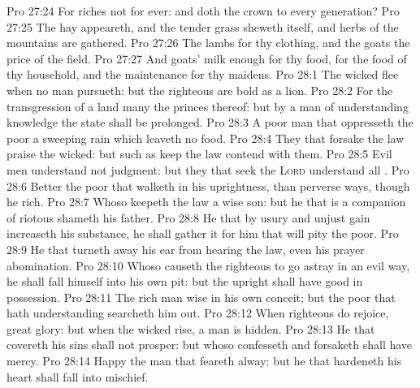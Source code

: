 \vs Pro 27:24 For riches  not for ever: and doth the crown  to every generation?
\vs Pro 27:25 The hay appeareth, and the tender grass sheweth itself, and herbs of the mountains are gathered.
\vs Pro 27:26 The lambs  for thy clothing, and the goats  the price of the field.
\vs Pro 27:27 And  goats' milk enough for thy food, for the food of thy household, and  the maintenance for thy maidens.
\vs Pro 28:1 The wicked flee when no man pursueth: but the righteous are bold as a lion.
\vs Pro 28:2 For the transgression of a land many  the princes thereof: but by a man of understanding  knowledge the state  shall be prolonged.
\vs Pro 28:3 A poor man that oppresseth the poor  a sweeping rain which leaveth no food.
\vs Pro 28:4 They that forsake the law praise the wicked: but such as keep the law contend with them.
\vs Pro 28:5 Evil men understand not judgment: but they that seek the \textsc{Lord} understand all .
\vs Pro 28:6 Better  the poor that walketh in his uprightness, than  perverse  ways, though he  rich.
\vs Pro 28:7 Whoso keepeth the law  a wise son: but he that is a companion of riotous  shameth his father.
\vs Pro 28:8 He that by usury and unjust gain increaseth his substance, he shall gather it for him that will pity the poor.
\vs Pro 28:9 He that turneth away his ear from hearing the law, even his prayer  abomination.
\vs Pro 28:10 Whoso causeth the righteous to go astray in an evil way, he shall fall himself into his own pit: but the upright shall have good  in possession.
\vs Pro 28:11 The rich man  wise in his own conceit; but the poor that hath understanding searcheth him out.
\vs Pro 28:12 When righteous  do rejoice,  great glory: but when the wicked rise, a man is hidden.
\vs Pro 28:13 He that covereth his sins shall not prosper: but whoso confesseth and forsaketh  shall have mercy.
\vs Pro 28:14 Happy  the man that feareth alway: but he that hardeneth his heart shall fall into mischief.
